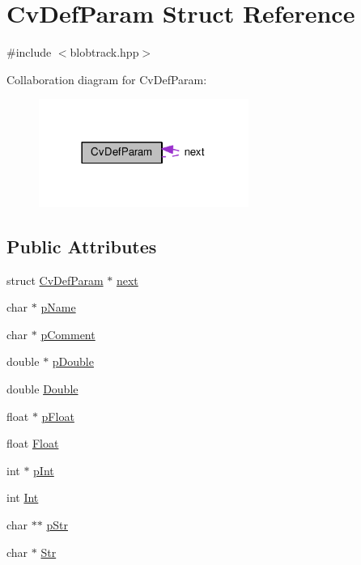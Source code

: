 \hypertarget{structCvDefParam}{\section{Cv\-Def\-Param Struct Reference}
\label{structCvDefParam}
}


{\ttfamily \#include $<$blobtrack.\-hpp$>$}



Collaboration diagram for Cv\-Def\-Param\-:\nopagebreak
\begin{figure}[H]
\begin{center}
\leavevmode
\includegraphics[width=194pt]{structCvDefParam__coll__graph}
\end{center}
\end{figure}
\subsection*{Public Attributes}
\begin{DoxyCompactItemize}
\item 
struct \hyperlink{structCvDefParam}{Cv\-Def\-Param} $\ast$ \hyperlink{structCvDefParam_ada577807235b973650625acab3cfffc6}{next}
\item 
char $\ast$ \hyperlink{structCvDefParam_a00d3066920cbdc6204a53fb14d96408f}{p\-Name}
\item 
char $\ast$ \hyperlink{structCvDefParam_a8cdbb35a09f1c26fb3cfd56ede3ffeca}{p\-Comment}
\item 
double $\ast$ \hyperlink{structCvDefParam_a171aac71c2ec7141591c74c07ff4d7a4}{p\-Double}
\item 
double \hyperlink{structCvDefParam_a6a9577093b1ebedfb431dc7f06ef1ec0}{Double}
\item 
float $\ast$ \hyperlink{structCvDefParam_ace15e986671c2e0077f6c7c20542df31}{p\-Float}
\item 
float \hyperlink{structCvDefParam_af5fbebcc4a968d15a0f3e52b291b0ca9}{Float}
\item 
int $\ast$ \hyperlink{structCvDefParam_a76942902e96d3af10a57e541ad695e19}{p\-Int}
\item 
int \hyperlink{structCvDefParam_a9e80637b6059a368c9877254babe603b}{Int}
\item 
char $\ast$$\ast$ \hyperlink{structCvDefParam_abbb4772f9b64b68e72d8f02c00e58efc}{p\-Str}
\item 
char $\ast$ \hyperlink{structCvDefParam_a2602cf197b1a178aafd1eb36a0cf0eb8}{Str}
\end{DoxyCompactItemize}


